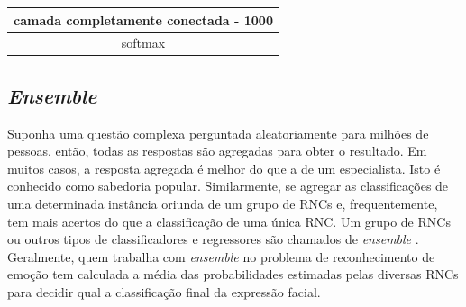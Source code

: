 \begin{table}[]
\begin{tabular}{|c|c|c|c|c|c|}
\multicolumn{6}{|c|}{camada completamente conectada - 1000}                                                                                                                                                                                                                                                                                                                                                                                   \\ \hline
\multicolumn{6}{|c|}{softmax}                                                                                                                                                                                                                                                                                                                                                                                                                 \\ \hline
\end{tabular}
\end{table}


\subsection{\textit{Ensemble}}
Suponha uma questão complexa perguntada aleatoriamente para milhões de pessoas, então, todas as respostas são agregadas para obter o resultado. Em muitos casos, a resposta agregada é melhor do que a de um especialista. Isto é conhecido como sabedoria popular. Similarmente, se agregar as classificações de uma determinada instância oriunda de um grupo de RNCs e, frequentemente, tem mais acertos do que a classificação de uma única RNC. Um grupo de RNCs ou outros tipos de classificadores e regressores são chamados de \textit{ensemble} \citep{geron2017hands}. Geralmente, quem trabalha com \textit{ensemble} no problema de reconhecimento de emoção tem calculada a média das probabilidades estimadas pelas diversas RNCs para decidir qual a classificação final da expressão facial.

